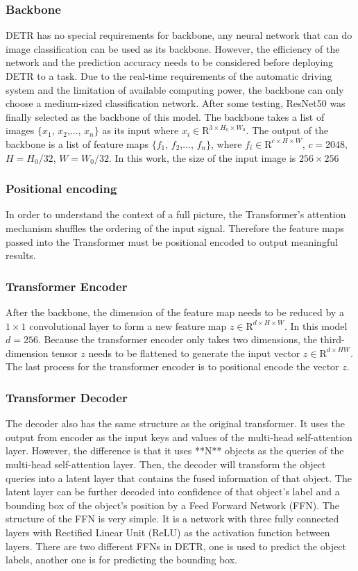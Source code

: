 \documentclass[conference]{IEEEtran}
\begin{document}
\subsubsection{Backbone}
DETR has no special requirements for backbone, any neural network that can do image classification can be used as its backbone. However, the efficiency of the network and the prediction accuracy needs to be considered before deploying DETR to a task. Due to the real-time requirements of the automatic driving system and the limitation of available computing power, the backbone can only choose a medium-sized classification network. After some testing, ResNet50 \cite{he2016deep} was finally selected as the backbone of this model. The backbone takes a list of images \(\{x_{1}\), \(x_{2}\),..., \(x_{n}\}\) as its input where \(x_{i}\in\mathrm{R}^{3\times H_{0}\times W_{0}}\). The output of the backbone is a list of feature maps \(\{f_{1}\), \(f_{2}\),..., \(f_{n}\}\), where \(f_{i}\in\mathrm{R}^{c\times H\times W}\), \(c=2048\), \(H=H_{0}/32\), \(W=W_{0}/32\). In this work, the size of the input image is \(256\times 256\)
\subsubsection{Positional encoding}
In order to understand the context of a full picture, the Transformer's attention mechanism shuffles the ordering of the input signal. Therefore the feature maps passed into the Transformer must be positional encoded to output meaningful results.

\subsubsection{Transformer Encoder}
After the backbone, the dimension of the feature map needs to be reduced by a \(1\times 1\) convolutional layer to form a new feature map \(z\in\mathrm{R}^{d\times H\times W}\). In this model \(d=256\). Because the transformer encoder only takes two dimensions, the third-dimension tensor \(z\) needs to be flattened to generate the input vector \(z\in\mathrm{R}^{d\times HW}\). The last process for the transformer encoder is to positional encode the vector \(z\).

\subsubsection{Transformer Decoder}
The decoder also has the same structure as the original transformer. It uses the output from encoder as the input keys and values of the multi-head self-attention layer. However, the difference is that it uses **N** objects as the queries of the multi-head self-attention layer. Then, the decoder will transform the object queries into a latent layer that contains the fused information of that object. The latent layer can be further decoded into confidence of that object's label and a bounding box of the object's position by a Feed Forward Network (FFN). The structure of the FFN is very simple. It is a network with three fully connected layers with Rectified Linear Unit (ReLU) as the activation function between layers. There are two different FFNs in DETR, one is used to predict the object labels, another one is for predicting the bounding box.
\end{document}
